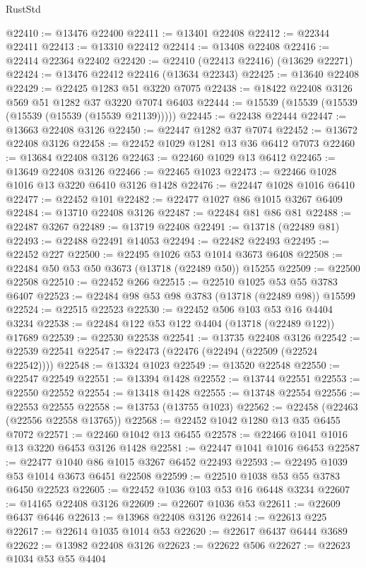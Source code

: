 \begin{lexlean}{RustStd}
\begin{coremodule}
@22410 := @13476 @22400
@22411 := @13401 @22408
@22412 := @22344 @22411
@22413 := @13310 @22412
@22414 := @13408 @22408
@22416 := @22414 @22364 @22402
@22420 := @22410 (@22413 @22416) (@13629 @22271)
@22424 := @13476 @22412 @22416 (@13634 @22343)
@22425 := @13640 @22408
@22429 := @22425 @1283 @51 @3220 @7075
@22438 := @18422 @22408 @3126 @569 @51 @1282 @37 @3220 @7074 @6403
@22444 := @15539 (@15539 (@15539 (@15539 (@15539 (@15539 @21139)))))
@22445 := @22438 @22444
@22447 := @13663 @22408 @3126
@22450 := @22447 @1282 @37 @7074
@22452 := @13672 @22408 @3126
@22458 := @22452 @1029 @1281 @13 @36 @6412 @7073
@22460 := @13684 @22408 @3126
@22463 := @22460 @1029 @13 @6412
@22465 := @13649 @22408 @3126
@22466 := @22465 @1023
@22473 := @22466 @1028 @1016 @13 @3220 @6410 @3126 @1428
@22476 := @22447 @1028 @1016 @6410
@22477 := @22452 @101
@22482 := @22477 @1027 @86 @1015 @3267 @6409
@22484 := @13710 @22408 @3126
@22487 := @22484 @81 @86 @81
@22488 := @22487 @3267
@22489 := @13719 @22408
@22491 := @13718 (@22489 @81)
@22493 := @22488 @22491 @14053
@22494 := @22482 @22493
@22495 := @22452 @227
@22500 := @22495 @1026 @53 @1014 @3673 @6408
@22508 := @22484 @50 @53 @50 @3673 (@13718 (@22489 @50)) @15255
@22509 := @22500 @22508
@22510 := @22452 @266
@22515 := @22510 @1025 @53 @55 @3783 @6407
@22523 := @22484 @98 @53 @98 @3783 (@13718 (@22489 @98)) @15599
@22524 := @22515 @22523
@22530 := @22452 @506 @103 @53 @16 @4404 @3234
@22538 := @22484 @122 @53 @122 @4404 (@13718 (@22489 @122)) @17689
@22539 := @22530 @22538
@22541 := @13735 @22408 @3126
@22542 := @22539 @22541
@22547 := @22473 (@22476 (@22494 (@22509 (@22524 @22542))))
@22548 := @13324 @1023
@22549 := @13520 @22548
@22550 := @22547 @22549
@22551 := @13394 @1428
@22552 := @13744 @22551
@22553 := @22550 @22552
@22554 := @13418 @1428
@22555 := @13748 @22554
@22556 := @22553 @22555
@22558 := @13753 (@13755 @1023)
@22562 := @22458 (@22463 (@22556 @22558 @13765))
@22568 := @22452 @1042 @1280 @13 @35 @6455 @7072
@22571 := @22460 @1042 @13 @6455
@22578 := @22466 @1041 @1016 @13 @3220 @6453 @3126 @1428
@22581 := @22447 @1041 @1016 @6453
@22587 := @22477 @1040 @86 @1015 @3267 @6452 @22493
@22593 := @22495 @1039 @53 @1014 @3673 @6451 @22508
@22599 := @22510 @1038 @53 @55 @3783 @6450 @22523
@22605 := @22452 @1036 @103 @53 @16 @6448 @3234
@22607 := @14165 @22408 @3126
@22609 := @22607 @1036 @53
@22611 := @22609 @6437 @6446
@22613 := @13968 @22408 @3126
@22614 := @22613 @225
@22617 := @22614 @1035 @1014 @53
@22620 := @22617 @6437 @6444 @3689
@22622 := @13982 @22408 @3126
@22623 := @22622 @506
@22627 := @22623 @1034 @53 @55 @4404

\end{coremodule}
\end{lexlean}
